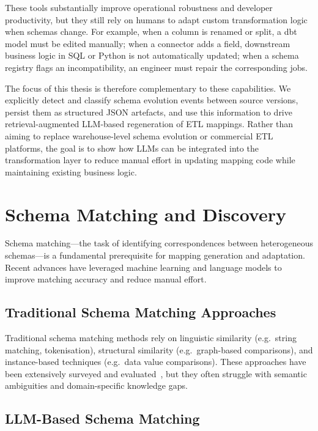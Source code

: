These tools substantially improve operational robustness and developer productivity, but they still rely on humans to adapt custom transformation logic when schemas change. For example, when a column is renamed or split, a dbt model must be edited manually; when a connector adds a field, downstream business logic in SQL or Python is not automatically updated; when a schema registry flags an incompatibility, an engineer must repair the corresponding jobs.

The focus of this thesis is therefore complementary to these capabilities. We explicitly detect and classify schema evolution events between source versions, persist them as structured JSON artefacts, and use this information to drive retrieval-augmented LLM-based regeneration of ETL mappings. Rather than aiming to replace warehouse-level schema evolution or commercial ETL platforms, the goal is to show how LLMs can be integrated into the transformation layer to reduce manual effort in updating mapping code while maintaining existing business logic.


\section{Schema Matching and Discovery}
\label{sec:related-schema-matching}

Schema matching---the task of identifying correspondences between heterogeneous schemas---is a fundamental prerequisite for mapping generation and adaptation. Recent advances have leveraged machine learning and language models to improve matching accuracy and reduce manual effort.

\subsection{Traditional Schema Matching Approaches}

Traditional schema matching methods rely on linguistic similarity (e.g.\ string matching, tokenisation), structural similarity (e.g.\ graph-based comparisons), and instance-based techniques (e.g.\ data value comparisons). These approaches have been extensively surveyed and evaluated~\cite{rahm2001survey}, but they often struggle with semantic ambiguities and domain-specific knowledge gaps.

\subsection{LLM-Based Schema Matching}

